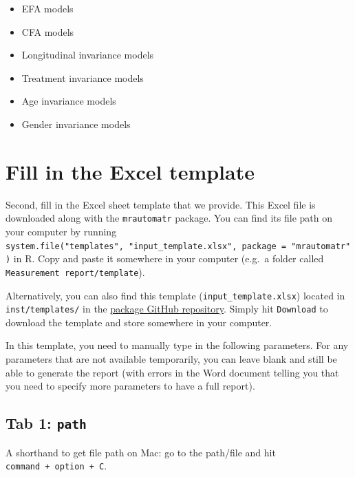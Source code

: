 \documentclass[
]{book}
\providecommand{\tightlist}{%
  \setlength{\itemsep}{0pt}\setlength{\parskip}{0pt}}
\begin{document}
\begin{itemize}
\tightlist
\item
  EFA models
\item
  CFA models
\item
  Longitudinal invariance models
\item
  Treatment invariance models
\item
  Age invariance models
\item
  Gender invariance models
\end{itemize}

\hypertarget{fill-in-the-excel-template}{%
\section{Fill in the Excel template}\label{fill-in-the-excel-template}}

Second, fill in the Excel sheet template that we provide. This Excel file is downloaded along with the \texttt{mrautomatr} package. You can find its file path on your computer by running \texttt{system.file("templates",\ "input\_template.xlsx",\ package\ =\ "mrautomatr")} in R. Copy and paste it somewhere in your computer (e.g.~a folder called \texttt{Measurement\ report/template}).

Alternatively, you can also find this template (\texttt{input\_template.xlsx}) located in \texttt{inst/templates/} in the \href{https://github.com/nyuglobalties/mrautomatr}{package GitHub repository}. Simply hit \texttt{Download} to download the template and store somewhere in your computer.

In this template, you need to manually type in the following parameters. For any parameters that are not available temporarily, you can leave blank and still be able to generate the report (with errors in the Word document telling you that you need to specify more parameters to have a full report).

\hypertarget{tab-1-path}{%
\subsection{\texorpdfstring{Tab 1: \texttt{path}}{Tab 1: path}}\label{tab-1-path}}

A shorthand to get file path on Mac: go to the path/file and hit \texttt{command\ +\ option\ +\ C}.
\end{document}
